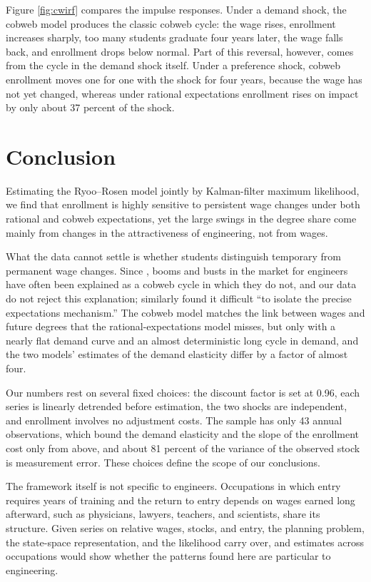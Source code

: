 \documentclass[12pt]{article}
\begin{document}
Figure \ref{fig:cwirf} compares the impulse responses. Under a demand shock, the cobweb model produces the classic cobweb cycle: the wage rises, enrollment increases sharply, too many students graduate four years later, the wage falls back, and enrollment drops below normal. Part of this reversal, however, comes from the cycle in the demand shock itself. Under a preference shock, cobweb enrollment moves one for one with the shock for four years, because the wage has not yet changed, whereas under rational expectations enrollment rises on impact by only about 37 percent of the shock.

\section{Conclusion}\label{sec:conclusion}

Estimating the Ryoo--Rosen model jointly by Kalman-filter maximum likelihood, we find that enrollment is highly sensitive to persistent wage changes under both rational and cobweb expectations, yet the large swings in the degree share come mainly from changes in the attractiveness of engineering, not from wages.

What the data cannot settle is whether students distinguish temporary from permanent wage changes. Since \citet{freeman1971market,freeman1976cobweb}, booms and busts in the market for engineers have often been explained as a cobweb cycle in which they do not, and our data do not reject this explanation; \citet[p.~S135]{ryoo2004engineering} similarly found it difficult ``to isolate the precise expectations mechanism.'' The cobweb model matches the link between wages and future degrees that the rational-expectations model misses, but only with a nearly flat demand curve and an almost deterministic long cycle in demand, and the two models' estimates of the demand elasticity differ by a factor of almost four.

Our numbers rest on several fixed choices: the discount factor is set at 0.96, each series is linearly detrended before estimation, the two shocks are independent, and enrollment involves no adjustment costs. The sample has only 43 annual observations, which bound the demand elasticity and the slope of the enrollment cost only from above, and about 81 percent of the variance of the observed stock is measurement error. These choices define the scope of our conclusions.

The framework itself is not specific to engineers. Occupations in which entry requires years of training and the return to entry depends on wages earned long afterward, such as physicians, lawyers, teachers, and scientists, share its structure. Given series on relative wages, stocks, and entry, the planning problem, the state-space representation, and the likelihood carry over, and estimates across occupations would show whether the patterns found here are particular to engineering.
\end{document}
